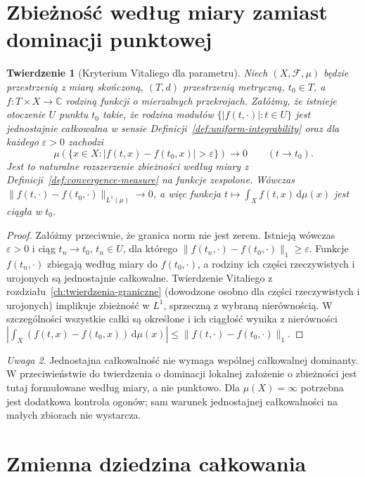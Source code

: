 \documentclass[11pt,a4paper,oneside]{book}
\numberwithin{equation}{chapter}
\theoremstyle{plain}
\newtheorem{twierdzenie}{Twierdzenie}[chapter]
\theoremstyle{definition}
\theoremstyle{remark}
\newtheorem{uwaga}[twierdzenie]{Uwaga}
\begin{document}
\section{Zbieżność według miary zamiast dominacji punktowej}

\begin{twierdzenie}[Kryterium Vitaliego dla parametru]
\label{thm:param-vitali-11}
Niech $(X,\mathcal F,\mu)$ będzie przestrzenią z miarą
skończoną, $(T,d)$ przestrzenią metryczną, $t_0\in T$,
a $f:T\times X\to\mathbb C$ rodziną funkcji o mierzalnych
przekrojach. Załóżmy, że istnieje otoczenie $U$ punktu
$t_0$ takie, że rodzina modułów
$\{|f(t,\cdot)|:t\in U\}$ jest jednostajnie całkowalna
w sensie Definicji~\ref{def:uniform-integrability}
oraz dla każdego $\varepsilon>0$ zachodzi
\[
\mu(\{x\in X:|f(t,x)-f(t_0,x)|>\varepsilon\})
\longrightarrow0\qquad(t\to t_0).
\]
Jest to naturalne rozszerzenie zbieżności według miary
z Definicji~\ref{def:convergence-measure} na funkcje
zespolone. Wówczas
$\|f(t,\cdot)-f(t_0,\cdot)\|_{L^1(\mu)}\to0$,
a więc funkcja $t\mapsto\int_X f(t,x)\,\mathrm d\mu(x)$
jest ciągła w $t_0$.
\end{twierdzenie}
\begin{proof}
Załóżmy przeciwnie, że granica norm nie jest zerem.
Istnieją wówczas $\varepsilon>0$ i ciąg $t_n\to t_0$,
$t_n\in U$, dla którego
$\|f(t_n,\cdot)-f(t_0,\cdot)\|_1\ge\varepsilon$.
Funkcje $f(t_n,\cdot)$ zbiegają według miary do
$f(t_0,\cdot)$, a rodziny ich części rzeczywistych i urojonych
są jednostajnie całkowalne. Twierdzenie Vitaliego
z rozdziału~\ref{ch:twierdzenia-graniczne}
(dowodzone osobno dla części rzeczywistych i urojonych)
implikuje zbieżność w $L^1$, sprzeczną z wybraną
nierównością. W szczególności wszystkie całki
są określone i ich ciągłość wynika z nierówności
$|\int_X(f(t,x)-f(t_0,x))\,\mathrm d\mu(x)|
\le\|f(t,\cdot)-f(t_0,\cdot)\|_1$.
\end{proof}

\begin{uwaga}
Jednostajna całkowalność nie wymaga wspólnej
całkowalnej dominanty. W przeciwieństwie do twierdzenia
o dominacji lokalnej założenie o zbieżności jest tutaj
formułowane według miary, a nie punktowo. Dla $\mu(X)=\infty$
potrzebna jest dodatkowa kontrola ogonów; sam warunek
jednostajnej całkowalności na małych zbiorach nie wystarcza.
\end{uwaga}

\section{Zmienna dziedzina całkowania}
\end{document}
